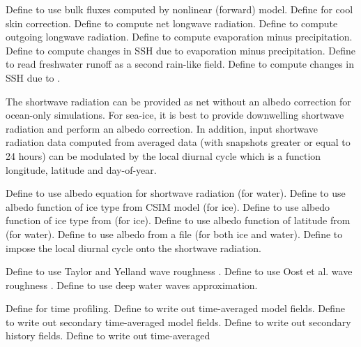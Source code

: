 \begin{klist}
\begin{klist}
     Define to use bulk fluxes computed by
  nonlinear (forward) model.
     Define for cool skin correction.
     Define to compute net longwave radiation.
     Define to compute outgoing longwave radiation.
     Define to compute evaporation minus precipitation.
     Define to compute changes in SSH due to
  evaporation minus precipitation.
     Define to read freshwater runoff as a second
  rain-like field.
     Define to compute changes in SSH due to
  .
  \end{klist}
 The shortwave radiation can be provided as net without an albedo
 correction for ocean-only simulations. For sea-ice, it is best to
 provide downwelling shortwave radiation and perform an albedo
 correction. In addition, input shortwave radiation data computed
 from averaged data (with snapshots greater or equal to 24 hours)
 can be modulated by the local diurnal cycle which is a function
 longitude, latitude and day-of-year.
   \begin{klist}
     Define to use albedo equation for shortwave
  radiation (for water).
     Define to use albedo function of ice type
  from CSIM model (for ice).
     Define to use albedo function of ice type
  from \citet{Ebert93} (for ice).
     Define to use albedo function of latitude
  from \citet{Large_08} (for water).
     Define to use albedo from a file (for both
  ice and water).
     Define to impose the local diurnal cycle
  onto the shortwave radiation.
   \end{klist}
   \mbox{}
  \begin{klist}
     Define to use Taylor and Yelland wave
  roughness \citep{Taylor_2001}.
     Define to use Oost et al. wave
  roughness \citep{Oost_2002}.
     Define to use deep water waves approximation.
  \end{klist}
   \mbox{}
  \begin{klist}
         Define for time profiling.
        Define to write out time-averaged
  model fields.
       Define to write out secondary time-averaged
  model fields.
       Define to write out secondary history fields.
        Define to write out time-averaged

\end{klist}
\end{klist}
